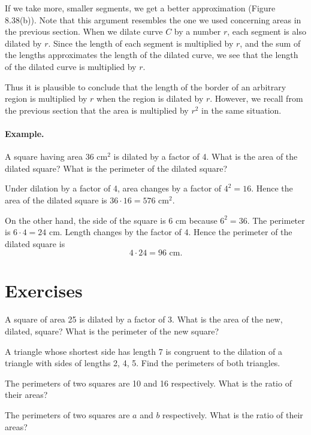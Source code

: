 \documentclass[12pt]{book} %
\begin{document}

If we take more, smaller segments, we get a better approximation (Figure 8.38(b)). Note that this argument resembles the one we used concerning areas in the previous section. When we dilate curve $C$ by a number $r$, each segment is also dilated by $r$. Since the length of each segment is multiplied by $r$, and the sum of the lengths approximates the length of the dilated curve, we see that the length of the dilated curve is multiplied by $r$.


Thus it is plausible to conclude that the length of the border of an arbitrary region is multiplied by $r$ when the region is dilated by $r$. However, we recall from the previous section that the area is multiplied by $r^2$ in the same situation.

\paragraph{Example.}
A square having area 36 cm$^2$ is dilated by a factor of 4. What is the area of the dilated square? What is the perimeter of the dilated square?

Under dilation by a factor of 4, area changes by a factor of $4^2=16$. Hence the area of the dilated square is $36\cdot 16=576$ cm$^2$.

On the other hand, the side of the square is 6 cm because $6^2=36$. The perimeter is $6\cdot 4=24$ cm. Length changes by the factor of 4. Hence the perimeter of the dilated square is
\[
4\cdot 24=96\text{ cm.}
\]

\section*{Exercises}

\setcounter{Exercise}{0}
\begin{ExerciseList}
\Exercise A square of area 25 is dilated by a factor of 3. What is the area of the new, dilated, square? What is the perimeter of the new square?

\Exercise A triangle whose shortest side has length 7 is congruent to the dilation of a triangle with sides of lengths 2, 4, 5. Find the perimeters of both triangles.

\Exercise The perimeters of two squares are 10 and 16 respectively. What is the ratio of their areas?

\Exercise The perimeters of two squares are $a$ and $b$ respectively. What is the ratio of their areas?
\end{ExerciseList}
\end{document}
